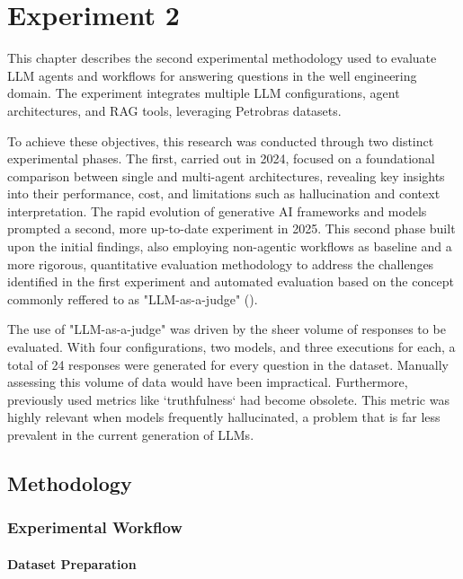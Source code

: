 \chapter{Experiment 2}
    
    This chapter describes the second experimental methodology used to evaluate LLM agents and workflows for answering questions in the well engineering domain. The experiment integrates multiple LLM configurations, agent architectures, and RAG tools, leveraging Petrobras datasets.

    To achieve these objectives, this research was conducted through two distinct experimental phases. The first, carried out in 2024, focused on a foundational comparison between single and multi-agent architectures, revealing key insights into their performance, cost, and limitations such as hallucination and context interpretation. The rapid evolution of generative AI frameworks and models prompted a second, more up-to-date experiment in 2025. This second phase built upon the initial findings, also employing non-agentic workflows as baseline and a more rigorous, quantitative evaluation methodology to address the challenges identified in the first experiment and automated evaluation based on the concept commonly reffered to as "LLM-as-a-judge" (\cite{Gu2025}).

    The use of "LLM-as-a-judge" was driven by the sheer volume of responses to be evaluated. With four configurations, two models, and three executions for each, a total of 24 responses were generated for every question in the dataset. Manually assessing this volume of data would have been impractical. Furthermore, previously used metrics like `truthfulness` had become obsolete. This metric was highly relevant when models frequently hallucinated, a problem that is far less prevalent in the current generation of LLMs. 

    \section{Methodology}

        \subsection{Experimental Workflow}

            \subsubsection{Dataset Preparation}

